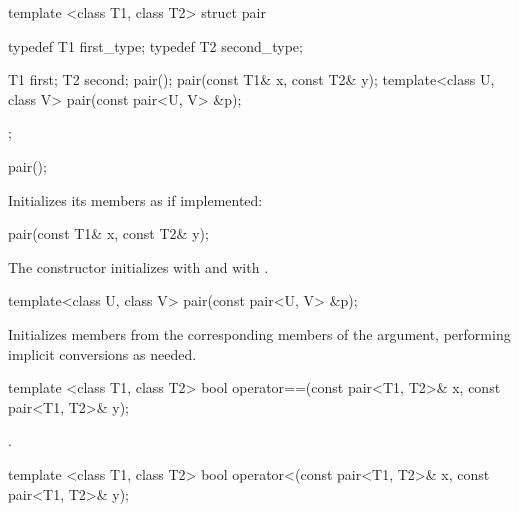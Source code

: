 \begin{codeblock}
template <class T1, class T2>
struct pair {
  typedef T1 first_type;
  typedef T2 second_type;

  T1 first;
  T2 second;
  pair();
  pair(const T1& x, const T2& y);
  template<class U, class V> pair(const pair<U, V> &p);
};
\end{codeblock}

\begin{itemdecl}
pair();
\end{itemdecl}

\pnum
\begin{itemdescr}
\effects
Initializes its members as if implemented:
\end{itemdescr}

\begin{itemdecl}
pair(const T1& x, const T2& y);
\end{itemdecl}

\pnum
\begin{itemdescr}
\effects
The constructor initializes  with  and 
with .
\end{itemdescr}

\begin{itemdecl}
template<class U, class V> pair(const pair<U, V> &p);
\end{itemdecl}

\pnum
\begin{itemdescr}
\effects
Initializes members from the corresponding members of the argument,
performing implicit conversions as needed.
\end{itemdescr}

%
\begin{itemdecl}
template <class T1, class T2>
  bool operator==(const pair<T1, T2>& x, const pair<T1, T2>& y);
\end{itemdecl}

\begin{itemdescr}
\pnum
\returns
{}.
\end{itemdescr}

%
\begin{itemdecl}
template <class T1, class T2>
  bool operator<(const pair<T1, T2>& x, const pair<T1, T2>& y);
\end{itemdecl}

